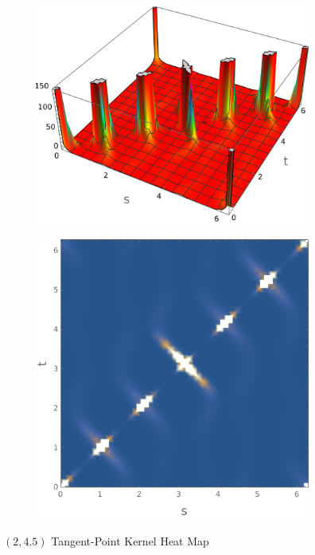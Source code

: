 \documentclass{beamer}
\theoremstyle{remark}
\begin{document}
\begin{frame}
    \begin{figure}[h]
        \centering
        \begin{subfigure}[b]{0.45\textwidth}
            \centering
            \includegraphics[width=\textwidth]{kHeatMap3.png}
        \end{subfigure}
        \begin{subfigure}[b]{0.45\textwidth}
            \centering
            \includegraphics[width=\textwidth]{kHeatMap4.png}
        \end{subfigure}
        \caption{$(2,4.5)$ Tangent-Point Kernel Heat Map}
    \end{figure}
\end{frame}
\end{document}
